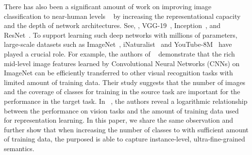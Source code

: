 \documentclass[sigconf]{acmart}
\begin{document}
There has also been a significant amount of work on improving image classification to near-human levels ~\cite{russakovsky2015imagenet} by increasing the representational capacity and the depth of network architectures.  See, \eg, VGG-19~\cite{simonyan2014very}, Inception~\cite{szegedy2016rethinking}, and ResNet~\cite{he2016deep}. To support learning such deep networks with millions of parameters, large-scale datasets such as ImageNet~\cite{krizhevsky2012imagenet},  iNaturalist~\cite{van2018inaturalist} and YouTube-8M~\cite{abu2016youtube} have played a crucial role. For example, the authors of ~\cite{oquab2014learning} demonstrate that the rich mid-level image features learned by Convolutional Neural Networks (CNNs) on ImageNet can be efficiently transferred to other visual recognition tasks with limited amount of training data. Their study suggests that the number of images and the coverage of classes for training in the source task are important for the performance in the target task. In ~\cite{sun2017revisiting}, the authors reveal a logarithmic relationship between the performance on vision tasks and the amount of training data used for representation learning. In this paper, we share the same observation and further show that when increasing the number of classes to  with sufficient amount of training data, the purposed {\ourmodel} is able to capture instance-level, ultra-fine-grained semantics.
\end{document}
